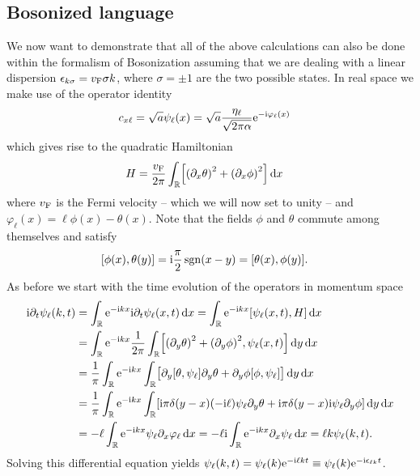 \documentclass[english, parskip=full]{scrartcl}
\begin{document}
\subsection{Bosonized language}
We now want to demonstrate that all of the above calculations can also be done within the formalism of Bosonization assuming that we are dealing with a linear dispersion $\epsilon_{k\sigma} = v_{\text{F}}\sigma k$, where $\sigma = \pm 1$ are the two possible states.
In real space we make use of the operator identity
\begin{align}
c_{x\ell} &= \sqrt{a} \psi_\ell(x) = \sqrt{a} \frac{\eta_\ell}{\sqrt{2\pi\alpha}} \text{e}^{-\text{i}\varphi_\ell(x)}
\end{align}
which gives rise to the quadratic Hamiltonian
\begin{align}
H &= \frac{\vf}{2\pi} \intr{\klb*{\kla*{\partial_x\theta}^2 + \kla*{\partial_x\phi}^2}}{x}
\end{align}
where $v_{\text{F}}$ is the Fermi velocity -- which we will now set to unity -- and $\varphi_\ell(x) = \ell \phi(x) - \theta(x)$.
Note that the fields $\phi$ and $\theta$ commute among themselves and satisfy
\begin{align}
\klb*{\phi(x),\theta(y)} &= \i\frac{\pi}{2} \sgn(x-y) = \klb*{\theta(x), \phi(y)}.
\end{align}
As before we start with the time evolution of the operators in momentum space
\begin{align}
\i\partial_t \psi_\ell(k,t) &= \intr{\powe{-\i kx} \i\partial_t\psi_\ell(x,t)}{x} = \intr{\powe{-\i kx} \klb*{\psi_\ell(x,t), H}}{x}\\
&= \intr{\powe{-\i kx} \frac{1}{2\pi}\intr{ \klb*{\kla*{\partial_y\theta}^2 + \kla*{\partial_y\phi}^2, \psi_\ell(x,t)} }{y} }{x}\\
&= \frac{1}{\pi} \intr{ \powe{-\i kx} \intr{ \klb[\big]{ \partial_y\klb*{\theta, \psi_\ell} \partial_y\theta + \partial_y\phi \klb*{\phi, \psi_\ell} } }{y} }{x}\\
&= \frac{1}{\pi} \intr{\powe{-\i kx} \intr{ \klb*{\i\pi\delta(y-x)(-\i\ell) \psi_\ell \partial_y\theta + \i\pi\delta(y-x) \i \psi_\ell \partial_y\phi} }{y} }{x}\\
&= -\ell \intr{\powe{-\i kx} \psi_\ell \partial_x\varphi_\ell}{x} = -\ell\i\intr{\powe{-\i kx} \partial_x\psi_\ell}{x} = \ell k \psi_\ell(k,t).
\end{align}
Solving this differential equation yields $\psi_\ell(k,t) = \psi_\ell(k) \text{e}^{-\text{i}\ell kt} \equiv \psi_\ell(k) \text{e}^{-\text{i} \epsilon_{\ell k} t}$.\\
\end{document}

